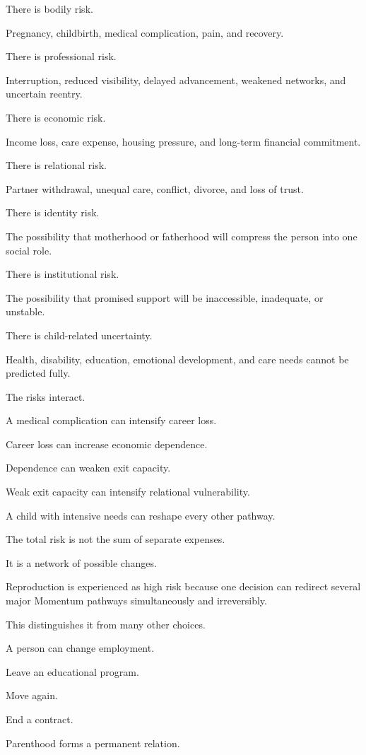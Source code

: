 There is bodily risk.

Pregnancy, childbirth, medical complication, pain, and recovery.

There is professional risk.

Interruption, reduced visibility, delayed advancement, weakened networks, and uncertain reentry.

There is economic risk.

Income loss, care expense, housing pressure, and long-term financial commitment.

There is relational risk.

Partner withdrawal, unequal care, conflict, divorce, and loss of trust.

There is identity risk.

The possibility that motherhood or fatherhood will compress the person into one social role.

There is institutional risk.

The possibility that promised support will be inaccessible, inadequate, or unstable.

There is child-related uncertainty.

Health, disability, education, emotional development, and care needs cannot be predicted fully.

The risks interact.

A medical complication can intensify career loss.

Career loss can increase economic dependence.

Dependence can weaken exit capacity.

Weak exit capacity can intensify relational vulnerability.

A child with intensive needs can reshape every other pathway.

The total risk is not the sum of separate expenses.

It is a network of possible changes.

Reproduction is experienced as high risk because one decision can redirect several major Momentum pathways simultaneously and irreversibly.

This distinguishes it from many other choices.

A person can change employment.

Leave an educational program.

Move again.

End a contract.

Parenthood forms a permanent relation.

